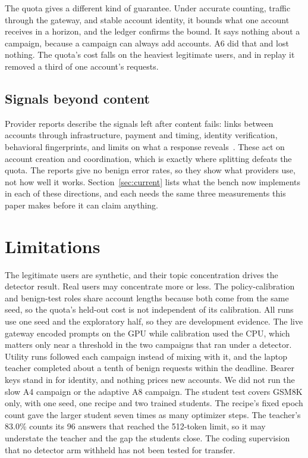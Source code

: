 \documentclass[journal]{IEEEtran}
\begin{document}
The quota gives a different kind of guarantee. Under accurate counting, traffic through the gateway, and stable account identity, it bounds what one account receives in a horizon, and the ledger confirms the bound. It says nothing about a campaign, because a campaign can always add accounts. A6 did that and lost nothing. The quota's cost falls on the heaviest legitimate users, and in replay it removed a third of one account's requests.

\subsection{Signals beyond content}
Provider reports describe the signals left after content fails: links between accounts through infrastructure, payment and timing, identity verification, behavioral fingerprints, and limits on what a response reveals~\cite{anthropic2026detecting,anthropic2026defenses,openai2026disrupting}. These act on account creation and coordination, which is exactly where splitting defeats the quota. The reports give no benign error rates, so they show what providers use, not how well it works. Section~\ref{sec:current} lists what the bench now implements in each of these directions, and each needs the same three measurements this paper makes before it can claim anything.

\section{Limitations}
\label{sec:scope}
The legitimate users are synthetic, and their topic concentration drives the detector result. Real users may concentrate more or less. The policy-calibration and benign-test roles share account lengths because both come from the same seed, so the quota's held-out cost is not independent of its calibration. All runs use one seed and the exploratory half, so they are development evidence. The live gateway encoded prompts on the GPU while calibration used the CPU, which matters only near a threshold in the two campaigns that ran under a detector. Utility runs followed each campaign instead of mixing with it, and the laptop teacher completed about a tenth of benign requests within the deadline. Bearer keys stand in for identity, and nothing prices new accounts. We did not run the slow A4 campaign or the adaptive A8 campaign. The student test covers GSM8K only, with one seed, one recipe and two trained students. The recipe's fixed epoch count gave the larger student seven times as many optimizer steps. The teacher's 83.0\% counts its 96 answers that reached the 512-token limit, so it may understate the teacher and the gap the students close. The coding supervision that no detector arm withheld has not been tested for transfer.
\end{document}
